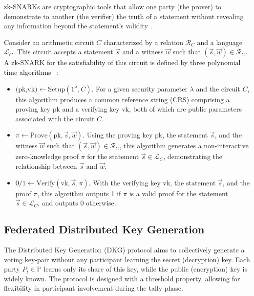 \documentclass[runningheads]{llncs}
\begin{document}
zk-SNARKs are cryptographic tools that allow one party (the prover) to demonstrate to another (the verifier) the truth of a statement without revealing any information beyond the statement's validity \cite{grothSizePairingbasedNoninteractive2016}.

Consider an arithmetic circuit $C$ characterized by a relation $\mathcal{R}_C$ and a language $\mathcal{L}_C$. This circuit accepts a statement $\vec{s}$ and a witness $\vec{w}$ such that $(\vec{s}, \vec{w}) \in \mathcal{R}_C$. A zk-SNARK for the satisfiability of this circuit is defined by three polynomial time algorithms ~\cite{grothSizePairingbasedNoninteractive2016,parnoPinocchioNearlyPractical2013}:

\begin{itemize}
    \item $\textrm{(pk,vk)} \gets \textrm{Setup}(1^\lambda,C)$. For a given security parameter $\lambda$ and the circuit $C$, this algorithm produces a common reference string (CRS) comprising a proving key $\textrm{pk}$ and a verifying key $\textrm{vk}$, both of which are public parameters associated with the circuit $C$.
    \item $\pi \gets \textrm{Prove}(\textrm{pk}, \vec{s}, \vec{w})$. Using the proving key $\textrm{pk}$, the statement $\vec{s}$, and the witness $\vec{w}$ such that $(\vec{s}, \vec{w}) \in \mathcal{R}_C$, this algorithm generates a non-interactive zero-knowledge proof $\pi$ for the statement $\vec{s} \in \mathcal{L}_C$, demonstrating the relationship between $\vec{s}$ and $\vec{w}$.
    \item $0/1 \gets \textrm{Verify}(\textrm{vk}, \vec{s}, \pi)$. With the verifying key $\textrm{vk}$, the statement $\vec{s}$, and the proof $\pi$, this algorithm outputs 1 if $\pi$ is a valid proof for the statement $\vec{s} \in \mathcal{L}_C$, and outputs 0 otherwise.
\end{itemize}


\subsection{Federated Distributed Key Generation}
The Distributed Key Generation (DKG) protocol aims to collectively generate a voting key-pair without any participant learning the secret (decryption) key. Each party $P_i \in \mathbb{P}$ learns only its share of this key, while the public (encryption) key is widely known. The protocol is designed with a threshold property, allowing for flexibility in participant involvement during the tally phase.
\end{document}
